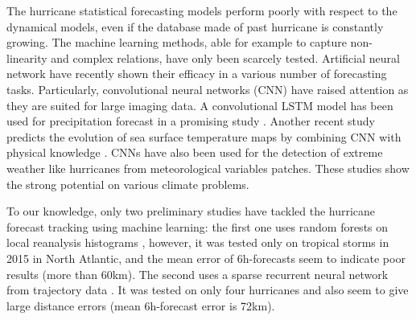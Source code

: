 The hurricane statistical forecasting models perform poorly with respect to the dynamical models, even if the database made of past hurricane is constantly growing. The machine learning methods, able for example to capture non-linearity and complex relations, have only been scarcely tested. Artificial neural network have recently shown their efficacy in a various number of forecasting tasks. Particularly, convolutional neural networks (CNN) have raised attention as they are suited for large imaging data. A convolutional LSTM model has been used for precipitation forecast in a promising study \cite{xingjian2015convolutional}. Another recent study predicts the evolution of sea surface temperature maps by combining CNN with physical knowledge \cite{de2017deep}. CNNs have also been used for the detection of extreme weather like hurricanes from meteorological variables patches\cite{racah2017extremeweather}. These studies show the strong potential on various climate problems. 

To our knowledge, only two preliminary studies have tackled the hurricane forecast tracking using machine learning: the first one uses random forests on local reanalysis histograms \cite{liberge2011prevision}, however, it was tested only on tropical storms in 2015 in North Atlantic, and the mean error of 6h-forecasts seem to indicate poor results (more than 60km). The second uses a sparse recurrent neural network from trajectory data \cite{moradi2016sparse}. It was tested on only four hurricanes and also seem to give large distance errors (mean 6h-forecast error is 72km). 


